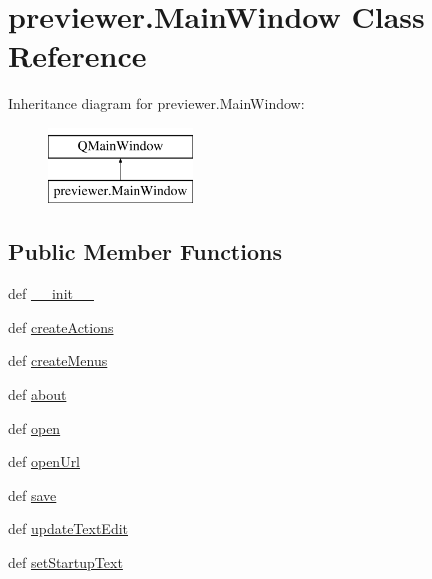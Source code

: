 \hypertarget{classpreviewer_1_1MainWindow}{}\section{previewer.\+Main\+Window Class Reference}
\label{classpreviewer_1_1MainWindow}
Inheritance diagram for previewer.\+Main\+Window\+:\begin{figure}[H]
\begin{center}
\leavevmode
\includegraphics[height=2.000000cm]{classpreviewer_1_1MainWindow}
\end{center}
\end{figure}
\subsection*{Public Member Functions}
\begin{DoxyCompactItemize}
\item 
def \hyperlink{classpreviewer_1_1MainWindow_aa749460b05b36032e390ac1df3ee76c5}{\+\_\+\+\_\+init\+\_\+\+\_\+}
\item 
def \hyperlink{classpreviewer_1_1MainWindow_a6f2ad1961082b140b5148fad6174e19f}{create\+Actions}
\item 
def \hyperlink{classpreviewer_1_1MainWindow_a1ff29a589eb5a286043e2476727105af}{create\+Menus}
\item 
def \hyperlink{classpreviewer_1_1MainWindow_a2c074e0b2e92a8e6b6d981a6f23ff978}{about}
\item 
def \hyperlink{classpreviewer_1_1MainWindow_a752473422f9cbbfc551cb22abf34496d}{open}
\item 
def \hyperlink{classpreviewer_1_1MainWindow_a04385af5c43ae6f6fbd3bdf75149ed7c}{open\+Url}
\item 
def \hyperlink{classpreviewer_1_1MainWindow_a26e19dbe268e2d1ef2f413f475685e84}{save}
\item 
def \hyperlink{classpreviewer_1_1MainWindow_a9492608863e186a8169157e114052dac}{update\+Text\+Edit}
\item 
def \hyperlink{classpreviewer_1_1MainWindow_a09a900a82cc27a98684c0fb51e4e394b}{set\+Startup\+Text}
\end{DoxyCompactItemize}
